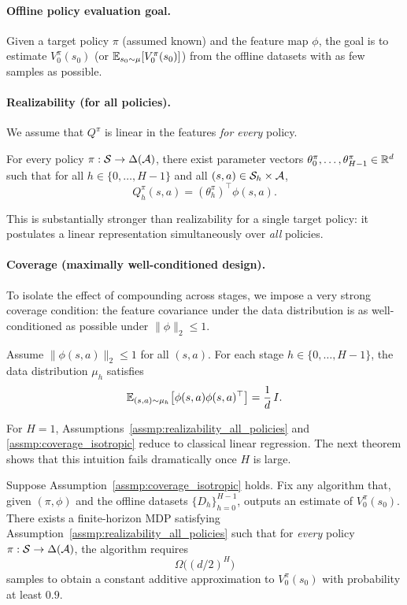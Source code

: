 \paragraph{Offline policy evaluation goal.}
Given a target policy $\pi$ (assumed known) and the feature map $\phi$, the goal
is to estimate $V^\pi_0(s_0)$ (or $\mathbb{E}_{s_0\sim\mu}[V^\pi_0(s_0)]$) from the offline
datasets with as few samples as possible.

\paragraph{Realizability (for all policies).}
We assume that $Q^\pi$ is linear in the features \emph{for every} policy.
\begin{assumption}
\label{assmp:realizability_all_policies}
For every policy $\pi:\mathcal{S}\to\Delta(\mathcal{A})$, there exist parameter vectors
$\theta_0^\pi,\dots,\theta_{H-1}^\pi\in\mathbb{R}^d$ such that for all
$h\in\{0,\dots,H-1\}$ and all $(s,a)\in\mathcal{S}_h\times\mathcal{A}$,
\[
Q_h^\pi(s,a)= (\theta_h^\pi)^\top \phi(s,a).
\]
\end{assumption}
This is substantially stronger than realizability for a single target policy: it
postulates a linear representation simultaneously over \emph{all} policies.

\paragraph{Coverage (maximally well-conditioned design).}
To isolate the effect of compounding across stages, we impose a very strong
coverage condition: the feature covariance under the data distribution is as
well-conditioned as possible under $\|\phi\|_2\le 1$.
\begin{assumption}[Coverage]
\label{assmp:coverage_isotropic}
Assume $\|\phi(s,a)\|_2\le 1$ for all $(s,a)$.  For each stage
$h\in\{0,\dots,H-1\}$, the data distribution $\mu_h$ satisfies
\[
\mathbb{E}_{(s,a)\sim\mu_h}\big[\phi(s,a)\phi(s,a)^\top\big]=\frac{1}{d}\,I.
\]
\end{assumption}

For $H=1$, Assumptions~\ref{assmp:realizability_all_policies} and
\ref{assmp:coverage_isotropic} reduce to classical linear regression.  The next
theorem shows that this intuition fails dramatically once $H$ is large.

\begin{theorem}
\label{thm:hard_offline_pe}
Suppose Assumption~\ref{assmp:coverage_isotropic} holds.  Fix any algorithm that,
given $(\pi,\phi)$ and the offline datasets $\{D_h\}_{h=0}^{H-1}$, outputs an
estimate of $V^\pi_0(s_0)$.  There exists a finite-horizon MDP satisfying
Assumption~\ref{assmp:realizability_all_policies} such that for \emph{every}
policy $\pi:\mathcal{S}\to\Delta(\mathcal{A})$, the algorithm requires
\[
\Omega\!\big((d/2)^H\big)
\]
samples to obtain a constant additive approximation to $V^\pi_0(s_0)$ with
probability at least $0.9$.
\end{theorem}


